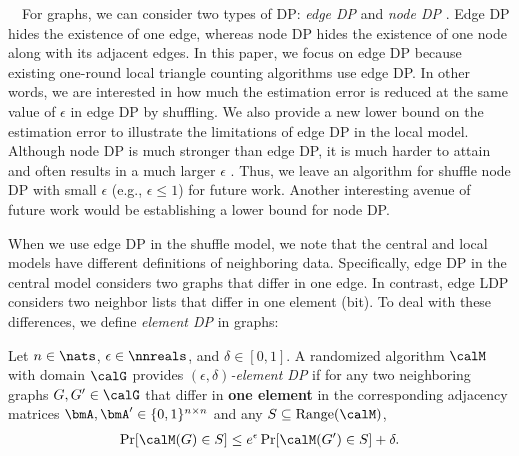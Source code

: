 \smallskip
{}~~For graphs, we can consider two types of DP: 
\textit{edge DP} and \textit{node DP} \cite{Hay_ICDM09,Raskhodnikova_Encyclopedia16}. 
Edge DP hides the existence of one edge, whereas node DP hides the existence of one node along with its adjacent edges. 
In this paper, we focus on edge DP because existing one-round local triangle counting algorithms \cite{Imola_USENIX21,Imola_USENIX22,Ye_ICDE20,Ye_TKDE21} use edge DP. 
In other words, we are interested in 
how much the estimation error is reduced at the same value of $\epsilon$ in edge DP by shuffling. 
We also provide a new lower bound on the estimation error to illustrate the limitations of edge DP in the local model. 
Although node DP is much stronger than edge DP, it is much harder to attain and often results in a much larger $\epsilon$ \cite{Chen_SIGMOD13,Sajadmanesh_arXiv22}. 
Thus, we leave an algorithm for shuffle node DP with small $\epsilon$ (e.g., $\epsilon \leq 1$) for future work. 
Another interesting avenue of future work would be establishing a lower bound for node DP. 

When we use edge DP in the shuffle model, we note that the central and local models have different definitions of neighboring data. 
Specifically, edge DP in the central model \cite{Raskhodnikova_Encyclopedia16} considers two graphs that differ in one edge. 
In contrast, edge LDP 
\cite{qin2017generating} considers two neighbor lists that differ in one element (bit). 
To deal with these differences, we define \textit{element DP} in graphs:

\begin{definition}  \label{chap3-def:element_DP} 
Let $n \in \nats$, $\epsilon \in \nnreals$, and $\delta \in [0,1]$. 
A randomized algorithm $\calM$ with domain $\calG$ provides \emph{$(\epsilon, \delta)$-element DP} 
if for any two neighboring graphs $G, G' \in \calG$ that differ in \textbf{one element} in the corresponding adjacency matrices $\bmA, \bmA' \in \{0,1\}^{n \times n}$
and any $S \subseteq \mathrm{Range}(\calM)$, 
\begin{align}
\Pr[\calM(G) \in S] \leq e^\epsilon \Pr[\calM(G') \in S] + \delta.
\label{chap3-eq:element_DP}
\end{align}
\end{definition}

